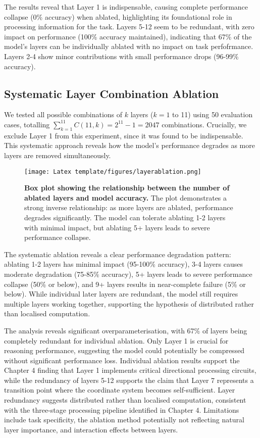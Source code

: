 The results reveal that Layer 1 is indispensable, causing complete performance collapse (0\% accuracy) when ablated, highlighting its foundational role in processing information for the task. Layers 5-12 seem to be redundant, with zero impact on performance (100\% accuracy maintained), indicating that 67\% of the model's layers can be individually ablated with no impact on task perfofrmance. Layers 2-4 show minor contributions with small performance drops (96-99\% accuracy). 

\subsection{Systematic Layer Combination Ablation}

We tested all possible combinations of $k$ layers ($k = 1$ to 11) using 50 evaluation cases, totalling $\sum_{k=1}^{11} C(11,k) = 2^{11} - 1 = 2047$ combinations. Crucially, we exclude Layer 1 from this experiment, since it was found to be indispensable. This systematic approach reveals how the model's performance degrades as more layers are removed simultaneously.

\begin{figure}[h]
\centering
\texttt{[image: Latex template/figures/layerablation.png]}
\caption[Systematic layer combination ablation results]{\textbf{Box plot showing the relationship between the number of ablated layers and model accuracy.} The plot demonstrates a strong inverse relationship: as more layers are ablated, performance degrades significantly. The model can tolerate ablating 1-2 layers with minimal impact, but ablating 5+ layers leads to severe performance collapse.}
\label{fig:systematic_layer_ablation}
\end{figure}

The systematic ablation reveals a clear performance degradation pattern: ablating 1-2 layers has minimal impact (95-100\% accuracy), 3-4 layers causes moderate degradation (75-85\% accuracy), 5+ layers leads to severe performance collapse (50\% or below), and 9+ layers results in near-complete failure (5\% or below). While individual later layers are redundant, the model still requires multiple layers working together, supporting the hypothesis of distributed rather than localised computation.


The analysis reveals significant overparameterisation, with 67\% of layers being completely redundant for individual ablation. Only Layer 1 is crucial for reasoning performance, suggesting the model could potentially be compressed without significant performance loss. Individual ablation results support the Chapter 4 finding that Layer 1 implements critical directional processing circuits, while the redundancy of layers 5-12 supports the claim that Layer 7 represents a transition point where the coordinate system becomes self-sufficient. Layer redundancy suggests distributed rather than localised computation, consistent with the three-stage processing pipeline identified in Chapter 4. Limitations include task specificity, the ablation method potentially not reflecting natural layer importance, and interaction effects between layers.


